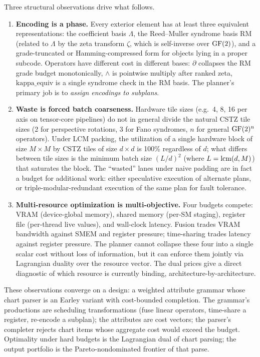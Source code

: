 Three structural observations drive what follows.

\begin{enumerate}[label=(\roman*)]
  \item \textbf{Encoding is a phase.} Every exterior element has at
    least three equivalent representations: the coefficient basis
    $\Lambda$, the Reed--Muller syndrome basis RM (related to
    $\Lambda$ by the zeta transform $\zeta$, which is
    self-inverse over $\operatorname{GF}(2)$), and a grade-truncated or
    Hamming-compressed form for objects lying in a proper subcode.
    Operators have different cost in different bases: $\partial$
    collapses the RM grade budget monotonically, $\wedge$ is
    pointwise multiply after ranked zeta, $\mathrm{kappa\_equiv}$
    is a single syndrome check in the RM basis. The planner's
    primary job is to \emph{assign encodings to subplans}.

  \item \textbf{Waste is forced batch coarseness.} Hardware tile
    sizes (e.g.\ 4, 8, 16 per axis on tensor-core pipelines) do not
    in general divide the natural CSTZ tile sizes (2 for perspective
    rotations, 3 for Fano syndromes, $n$ for general $\operatorname{GF}(2)^n$
    operators). Under LCM packing, the utilization of a
    single hardware block of size $M \times M$ by CSTZ tiles of
    size $d \times d$ is 100\% regardless of $d$; what differs
    between tile sizes is the minimum batch size $(L/d)^2$ (where
    $L = \operatorname{lcm}(d,M)$) that saturates the block. The ``wasted'' lanes
    under naive padding are in fact a budget for additional work:
    either speculative execution of alternate plans, or
    triple-modular-redundant execution of the same plan for fault
    tolerance.

  \item \textbf{Multi-resource optimization is multi-objective.}
    Four budgets compete: VRAM (device-global memory), shared
    memory (per-SM staging), register file (per-thread live values),
    and wall-clock latency. Fusion trades VRAM bandwidth against
    SMEM and register pressure; time-sharing trades latency against
    register pressure. The planner cannot collapse these four into
    a single scalar cost without loss of information, but it can
    enforce them jointly via Lagrangian duality over the resource
    vector. The dual prices give a direct diagnostic of which
    resource is currently binding, architecture-by-architecture.
\end{enumerate}

These observations converge on a design: a weighted attribute
grammar whose chart parser is an Earley variant with cost-bounded
completion. The grammar's productions are scheduling transformations
(fuse linear operators, time-share a register, re-encode a subplan);
the attributes are cost vectors; the parser's completer rejects
chart items whose aggregate cost would exceed the budget. Optimality
under hard budgets is the Lagrangian dual of chart parsing; the
output portfolio is the Pareto-nondominated frontier of that parse.

